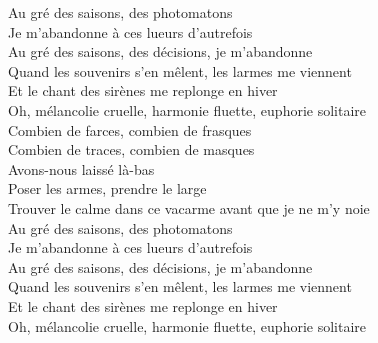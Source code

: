 \documentclass{novel}
\begin{document}
Au gré des saisons, des photomatons \\
Je m'abandonne à ces lueurs d'autrefois \\
Au gré des saisons, des décisions, je m'abandonne \\

Quand les souvenirs s'en mêlent, les larmes me viennent \\
Et le chant des sirènes me replonge en hiver \\
Oh, mélancolie cruelle, harmonie fluette, euphorie solitaire \\

Combien de farces, combien de frasques \\
Combien de traces, combien de masques \\
Avons-nous laissé là-bas \\

Poser les armes, prendre le large \\
Trouver le calme dans ce vacarme avant que je ne m'y noie \\

Au gré des saisons, des photomatons \\
Je m'abandonne à ces lueurs d'autrefois \\
Au gré des saisons, des décisions, je m'abandonne \\

Quand les souvenirs s'en mêlent, les larmes me viennent \\
Et le chant des sirènes me replonge en hiver \\
Oh, mélancolie cruelle, harmonie fluette, euphorie solitaire
\end{document}
